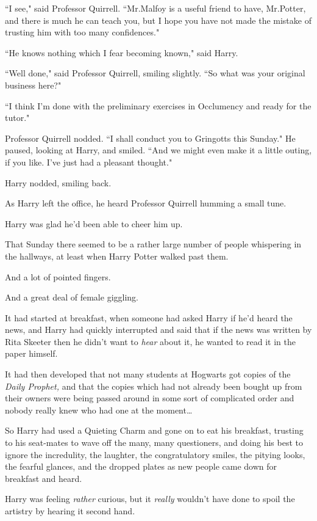 ``I see," said Professor Quirrell. ``Mr.\?Malfoy is a useful friend to have, Mr.\?Potter, and there is much he can teach you, but I hope you have not made the mistake of trusting him with too many confidences."

``He knows nothing which I fear becoming known," said Harry.

``Well done," said Professor Quirrell, smiling slightly. ``So what was your original business here?"

``I think I'm done with the preliminary exercises in Occlumency and ready for the tutor."

Professor Quirrell nodded. ``I shall conduct you to Gringotts this Sunday." He paused, looking at Harry, and smiled. ``And we might even make it a little outing, if you like. I've just had a pleasant thought."

Harry nodded, smiling back.

As Harry left the office, he heard Professor Quirrell humming a small tune.

Harry was glad he'd been able to cheer him up.

\later

That Sunday there seemed to be a rather large number of people whispering in the hallways, at least when Harry Potter walked past them.

And a lot of pointed fingers.

And a great deal of female giggling.

It had started at breakfast, when someone had asked Harry if he'd heard the news, and Harry had quickly interrupted and said that if the news was written by Rita Skeeter then he didn't want to \emph{hear} about it, he wanted to read it in the paper himself.

It had then developed that not many students at Hogwarts got copies of the \emph{Daily Prophet,} and that the copies which had not already been bought up from their owners were being passed around in some sort of complicated order and nobody really knew who had one at the moment{\ldots}

So Harry had used a Quieting Charm and gone on to eat his breakfast, trusting to his seat-mates to wave off the many, many questioners, and doing his best to ignore the incredulity, the laughter, the congratulatory smiles, the pitying looks, the fearful glances, and the dropped plates as new people came down for breakfast and heard.

Harry was feeling \emph{rather} curious, but it \emph{really} wouldn't have done to spoil the artistry by hearing it second hand.

